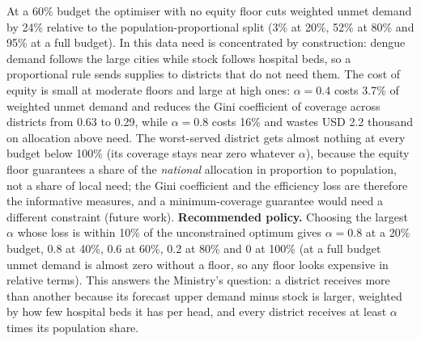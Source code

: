 \documentclass[conference]{IEEEtran}
\begin{document}
At a 60\% budget the optimiser with no equity floor cuts weighted unmet demand by 24\% relative to the population-proportional split (3\% at 20\%, 52\% at 80\% and 95\% at a full budget). In this data need is concentrated by construction: dengue demand follows the large cities while stock follows hospital beds, so a proportional rule sends supplies to districts that do not need them. The cost of equity is small at moderate floors and large at high ones: $\alpha=0.4$ costs 3.7\% of weighted unmet demand and reduces the Gini coefficient of coverage across districts from 0.63 to 0.29, while $\alpha=0.8$ costs 16\% and wastes USD 2.2 thousand on allocation above need. The worst-served district gets almost nothing at every budget below 100\% (its coverage stays near zero whatever $\alpha$), because the equity floor guarantees a share of the \emph{national} allocation in proportion to population, not a share of local need; the Gini coefficient and the efficiency loss are therefore the informative measures, and a minimum-coverage guarantee would need a different constraint (future work). \textbf{Recommended policy.} Choosing the largest $\alpha$ whose loss is within 10\% of the unconstrained optimum gives $\alpha=0.8$ at a 20\% budget, 0.8 at 40\%, 0.6 at 60\%, 0.2 at 80\% and 0 at 100\% (at a full budget unmet demand is almost zero without a floor, so any floor looks expensive in relative terms). This answers the Ministry's question: a district receives more than another because its forecast upper demand minus stock is larger, weighted by how few hospital beds it has per head, and every district receives at least $\alpha$ times its population share.
\end{document}
